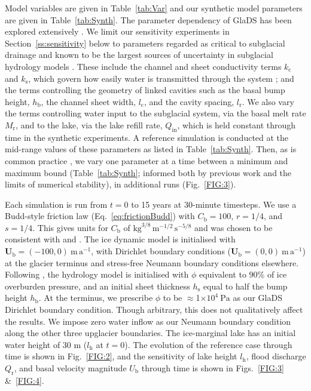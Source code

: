 \documentclass[tc, manuscript]{copernicus}
\begin{document}
Model variables are given in Table~\ref{tab:Var} and our synthetic model parameters are given in Table~\ref{tab:Synth}. The parameter dependency of GlaDS has been explored extensively \citep[e.g.,][]{dow2016modeling,dow2020totten,hill2024improved}. We limit our sensitivity experiments in Section~\ref{ss:sensitivity} below to parameters regarded as critical to subglacial drainage and known to be the largest sources of uncertainty in subglacial hydrology models \citep{werder2013modeling,hill2025computationally,hill2025emulator}. These include the channel and sheet conductivity terms $k_{\mathrm{c}}$ and $k_{\mathrm{s}}$, which govern how easily water is transmitted through the system \citep[i.e., a hard-bedded glacier might be expected to have a higher conductivity than a soft-bedded glacier][]{dow2022role}; and the terms controlling the geometry of linked cavities such as the basal bump height, $h_{\mathrm{b}}$, the channel sheet width, $l_{\mathrm{c}}$, and the cavity spacing, $l_{\mathrm{r}}$. We also vary the terms controlling water input to the subglacial system, via the basal melt rate $M_{\mathrm{r}}$, and to the lake, via the lake refill rate, $Q_{\mathrm{in}}$, which is held constant through time in the synthetic experiments. A reference simulation is conducted at the mid-range values of these parameters as listed in Table~\ref{tab:Synth}. Then, as is common practice \citep{dow2022role}, we vary one parameter at a time between a minimum and maximum bound (Table~\ref{tab:Synth}; informed both by previous work and the limits of numerical stability), in additional runs (Fig.~\ref{FIG:3}). 

Each simulation is run from $t=0$ to 15 years at 30-minute timesteps. We use a Budd-style friction law (Eq.~\ref{eq:frictionBudd}) with $C_{\mathrm{b}} = 100$, $r = 1/4$, and $s = 1/4$. This gives units for $C_{\mathrm{b}}$ of $\mathrm{kg}^{3/8}\,\mathrm{m}^{-1/2}\,\mathrm{s}^{-5/8}$ and was chosen to be consistent with \citet{bindschadler1983importance} and \citet{kingslake2013modelling}. The ice dynamic model is initialised with $\mathbf{U}_{\mathrm{b}} = (-100,0)\ \mathrm{m\,a}^{-1}$, with Dirichlet boundary conditions ($\mathbf{U}_{\mathrm{b}} = (0,0)\ \mathrm{m\,a}^{-1}$) at the glacier terminus and stress-free Neumann boundary conditions elsewhere. Following \cite{hill2024improved}, the hydrology model is initialised with $\phi$ equivalent to 90\% of ice overburden pressure, and an initial sheet thickness $h_{\mathrm{s}}$ equal to half the bump height $h_{\mathrm{b}}$. At the terminus, we prescribe $\phi$ to be $\approx$1$\times10^{4}\ \mathrm{Pa}$ as our GlaDS Dirichlet boundary condition. Though arbitrary, this does not qualitatively affect the results. We impose zero water inflow as our Neumann boundary condition along the other three upglacier boundaries. The ice-marginal lake has an initial water height of 30 m ($l_{\mathrm{h}}$ at $t=0$). The evolution of the reference case through time is shown in Fig.~\ref{FIG:2}, and the sensitivity of lake height $l_{\mathrm{h}}$, flood discharge $Q_{\mathrm{r}}$, and basal velocity magnitude $U_{\mathrm{b}}$ through time is shown in Figs.~\ref{FIG:3} \&~\ref{FIG:4}.
\end{document}
